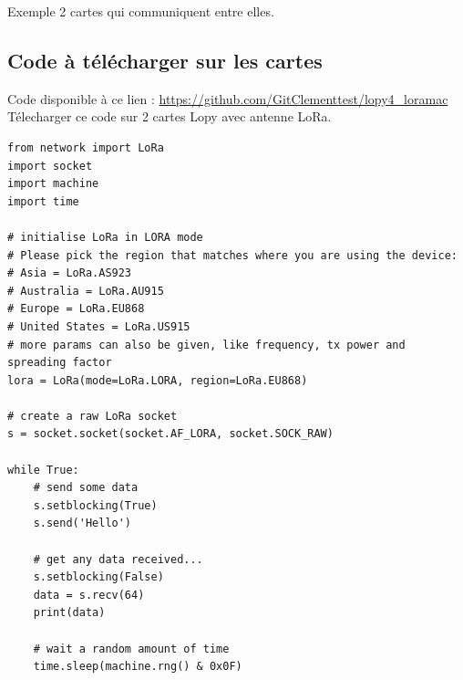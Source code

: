 \documentclass{article}
\begin{document}
Exemple 2 cartes qui communiquent entre elles.
\\


\subsection{Code à télécharger sur les cartes}

Code disponible à ce lien : \url{https://github.com/GitClementtest/lopy4_loramac}\\








Télecharger ce code sur 2 cartes Lopy avec antenne LoRa.

\begin{verbatim}
from network import LoRa
import socket
import machine
import time

# initialise LoRa in LORA mode
# Please pick the region that matches where you are using the device:
# Asia = LoRa.AS923
# Australia = LoRa.AU915
# Europe = LoRa.EU868
# United States = LoRa.US915
# more params can also be given, like frequency, tx power and spreading factor
lora = LoRa(mode=LoRa.LORA, region=LoRa.EU868)

# create a raw LoRa socket
s = socket.socket(socket.AF_LORA, socket.SOCK_RAW)

while True:
    # send some data
    s.setblocking(True)
    s.send('Hello')

    # get any data received...
    s.setblocking(False)
    data = s.recv(64)
    print(data)

    # wait a random amount of time
    time.sleep(machine.rng() & 0x0F)




\end{verbatim}
\end{document}

